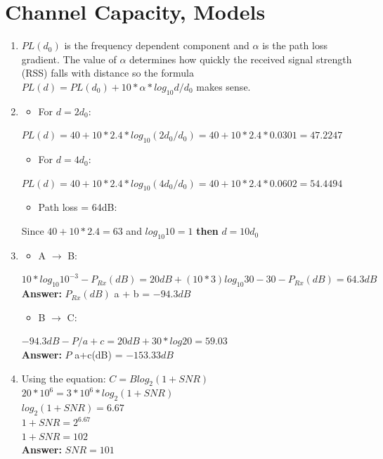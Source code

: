 \documentclass[11pt]{article}
\begin{document}
\section{Channel Capacity, Models}
\begin{enumerate}[label=(\alph*)]

\item {
	$PL(d_0)$ is the frequency dependent component and $\alpha$ is the path loss gradient. The value of $\alpha$ 
	determines how quickly the received signal strength (RSS) falls with distance so the formula 
	$PL(d) = PL(d_0) + 10 * \alpha * log_{10} d/d_0$ makes sense.
}

\item {
	\begin{itemize} \item For $d = 2d_0$: \end{itemize}
	$PL(d) = 40 + 10 * 2.4 * log_{10} (2d_0/d_0) = 40 + 10 * 2.4 * 0.0301 = 47.2247$
	
	\begin{itemize} \item For $d = 4d_0$: \end{itemize}
	$PL(d) = 40 + 10 * 2.4 * log_{10} (4d_0/d_0) = 40 + 10 * 2.4 * 0.0602 = 54.4494$
	
	\begin{itemize} \item Path loss  = 64dB:  \end{itemize}
	Since $40 + 10 * 2.4 = 63$ and $log_{10}10 = 1$ \textbf{then} $d = 10d_0$
}

\item {
	\begin{itemize} \item A $\rightarrow$ B: \end{itemize}
	$10 * log_{10} 10^{-3} - P_{Rx}(dB) = 20dB + (10 * 3) log_{10} 30 - 30 - P_{Rx}(dB) = 64.3 dB$\\
	\textbf{Answer:} $P_{Rx}(dB)$ a + b = $-94.3 dB$
	
	\begin{itemize} \item B $\rightarrow$ C: \end{itemize}
	$-94.3dB - P/a+c = 20dB + 30 * log 20 = 59.03$\\
	\textbf{Answer:} $P$ a+c(dB) = $-153.33 dB$
}

\item {
	Using the equation: $C = B log_2 (1 + SNR)$\\
	$20 * 10^6 = 3 * 10^6 * log_2 (1+SNR)$\\
	$log_2 (1+SNR) = 6.67$\\
	$1 + SNR = 2^{6.67}$\\
	$1+ SNR = 102$\\
	\textbf{Answer: } $SNR = 101$
}

\end{enumerate}
\end{document}
